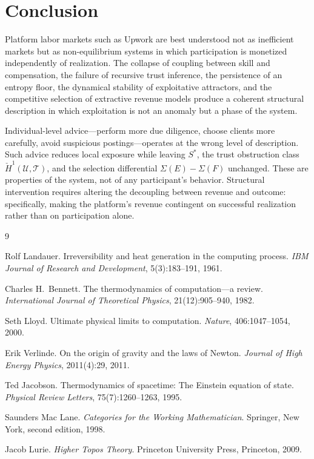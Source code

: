 \documentclass[11pt]{article}
\begin{document}
\section{Conclusion}
\label{sec:conclusion}

Platform labor markets such as Upwork are best understood not as inefficient
markets but as non-equilibrium systems in which participation is monetized
independently of realization. The collapse of coupling between skill and
compensation, the failure of recursive trust inference, the persistence of
an entropy floor, the dynamical stability of exploitative attractors, and
the competitive selection of extractive revenue models produce a coherent
structural description in which exploitation is not an anomaly but a phase
of the system.

Individual-level advice---perform more due diligence, choose clients more
carefully, avoid suspicious postings---operates at the wrong level of
description. Such advice reduces local exposure while leaving $S^*$, the
trust obstruction class $\check{H}^1(\mathcal{U}, \mathscr{T})$, and the
selection differential $\Sigma(E) - \Sigma(F)$ unchanged. These are
properties of the system, not of any participant's behavior. Structural
intervention requires altering the decoupling between revenue and outcome:
specifically, making the platform's revenue contingent on successful
realization rather than on participation alone.

\begin{thebibliography}{9}

Rolf Landauer.
Irreversibility and heat generation in the computing process.
\textit{IBM Journal of Research and Development}, 5(3):183--191, 1961.

Charles H.\ Bennett.
The thermodynamics of computation---a review.
\textit{International Journal of Theoretical Physics}, 21(12):905--940, 1982.

Seth Lloyd.
Ultimate physical limits to computation.
\textit{Nature}, 406:1047--1054, 2000.

Erik Verlinde.
On the origin of gravity and the laws of Newton.
\textit{Journal of High Energy Physics}, 2011(4):29, 2011.

Ted Jacobson.
Thermodynamics of spacetime: The Einstein equation of state.
\textit{Physical Review Letters}, 75(7):1260--1263, 1995.

Saunders Mac Lane.
\textit{Categories for the Working Mathematician}.
Springer, New York, second edition, 1998.

Jacob Lurie.
\textit{Higher Topos Theory}.
Princeton University Press, Princeton, 2009.

\end{thebibliography}
\end{document}
